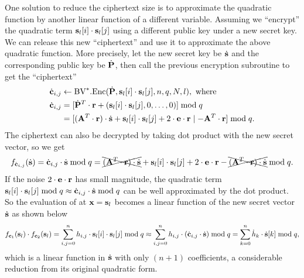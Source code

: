 \documentclass[../main.tex]{subfiles}
\begin{document}
One solution to reduce the ciphertext size is to approximate the quadratic function by another linear function of a different variable. Assuming we ``encrypt'' the quadratic term $\mathbf{s}_l[i] \cdot \mathbf{s}_l[j]$ using a different public key under a new secret key. We can release this new ``ciphertext'' and use it to approximate the above quadratic function. More precisely, let the new secret key be $\dot{\mathbf{s}}$ and the corresponding public key be $\dot{\mathbf{P}}$, then call the previous encryption subroutine to get the ``ciphertext''
\begin{align*}
    \dot{\mathbf{c}}_{i,j} &\leftarrow \text{BV}^*.\text{Enc}(\dot{\mathbf{P}},\mathbf{s}_l[i] \cdot \mathbf{s}_l [j],n,q,N,l), \text{ where }\\
    \dot{\mathbf{c}}_{i,j}&=[\dot{\mathbf{P}}^T\cdot \mathbf{r} + (\mathbf{s}_l[i] \cdot \mathbf{s}_l [j],0,\dots,0)] \bmod q\\
    &=[(\mathbf{A}^T \cdot \mathbf{r})\cdot \dot{\mathbf{s}} + \mathbf{s}_l[i] \cdot \mathbf{s}_l [j]+ 2 \cdot \mathbf{e} \cdot \mathbf{r} \mid -\mathbf{A}^T \cdot \mathbf{r}] \bmod q.
\end{align*}
The ciphertext can also be decrypted by taking dot product with the new secret vector, so we get
\begin{align*}
    f_{\dot{\mathbf{c}}_{i,j}}(\dot{\mathbf{s}})=\dot{\mathbf{c}}_{i,j} \cdot \dot{\mathbf{s}} \bmod q = \xcancel{(\mathbf{A}^T \cdot \mathbf{r})\cdot \dot{\mathbf{s}}} + \mathbf{s}_l[i] \cdot \mathbf{s}_l[j]+ 2 \cdot \mathbf{e} \cdot \mathbf{r} -\xcancel{(\mathbf{A}^T \cdot \mathbf{r}) \cdot \dot{\mathbf{s}}} \bmod q.
\end{align*}
If the noise $2 \cdot \mathbf{e} \cdot \mathbf{r}$ has small magnitude, the quadratic term $\mathbf{s}_l[i] \cdot \mathbf{s}_l[j] \bmod q \approx \dot{\mathbf{c}}_{i,j} \cdot \dot{\mathbf{s}} \bmod q$ can be well approximated by the dot product. So the evaluation of  at $\mathbf{x}=\mathbf{s}_l$ becomes a linear function of the new secret vector $\dot{\mathbf{s}}$ as shown below
\begin{align*}
    f_{\mathbf{c}_1}(\mathbf{s}_l) \cdot f_{\mathbf{c}_2}(\mathbf{s}_l) 
    = \sum_{i,j=0}^n h_{i,j} \cdot \mathbf{s}_l[i] \cdot \mathbf{s}_l[j] \bmod q
    \approx \sum_{i,j=0}^n h_{i,j} \cdot (\dot{\mathbf{c}}_{i,j} \cdot \dot{\mathbf{s}}) \bmod q
    =\sum_{k=0}^n \dot{h}_{k} \cdot \dot{\mathbf{s}}[k] \bmod q,
\end{align*}
which is a linear function in $\dot{\mathbf{s}}$ with only $(n+1)$ coefficients, a considerable reduction from its original quadratic form. 
\end{document}
